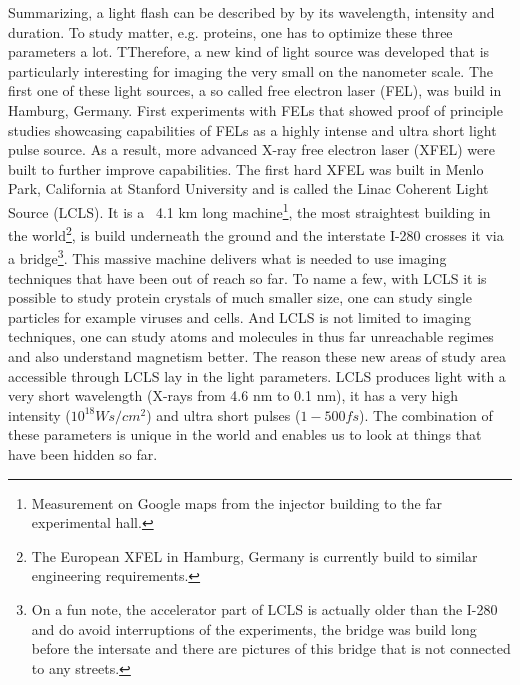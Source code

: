 Summarizing, a light flash can be described by by its wavelength, intensity and duration. To study matter, e.g. proteins, one has to optimize these three parameters a lot. TTherefore, a new kind of light source was developed that is particularly interesting for imaging the very small on the nanometer scale. The first one of these light sources, a so called free electron laser (FEL), was build in Hamburg, Germany. First experiments with FELs that showed proof of principle studies showcasing capabilities of FELs as a highly intense and ultra short light pulse source. As a result, more advanced X-ray free electron laser (XFEL) were built to further improve capabilities. The first hard XFEL was built in Menlo Park, California at Stanford University and is called the Linac Coherent Light Source (LCLS). It is a ~4.1 km long machine\footnote{Measurement on Google maps from the injector building to the far experimental hall.}, the most straightest building in the world\footnote{The European XFEL in Hamburg, Germany is currently build to similar engineering requirements.}, is build underneath the ground and the interstate I-280 crosses it via a bridge\footnote{On a fun note, the accelerator part of LCLS is actually older than the I-280 and do avoid interruptions of the experiments, the bridge was build long before the intersate and there are pictures of this bridge that is not connected to any streets.}. This massive machine delivers what is needed to use imaging techniques that have been out of reach so far. To name a few, with LCLS it is possible to study protein crystals of much smaller size, one can study single particles for example viruses and cells. And LCLS is not limited to imaging techniques, one can study atoms and molecules in thus far unreachable regimes and also understand magnetism better. The reason these new areas of study area accessible through LCLS lay in the light parameters. LCLS produces light with a very short wavelength (X-rays from 4.6 nm to 0.1 nm), it has a very high intensity ($10^18 Ws/cm^{2}$) and ultra short pulses ($1-500 fs$). The combination of these parameters is unique in the world and enables us to look at things that have been hidden so far.\\
